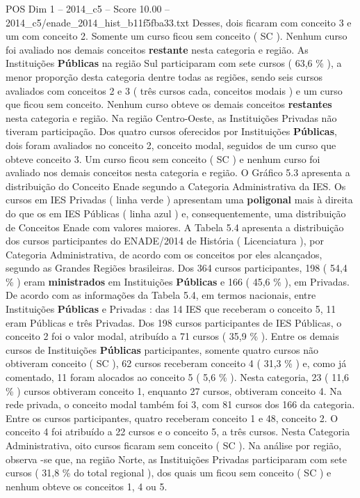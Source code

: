 \begin{textsample}{POS Dim 1 – 2014\_c5 – Score 10.00 – 2014\_c5/enade\_2014\_hist\_b11f5fba33.txt}
Desses, dois ficaram com conceito 3 e um com conceito 2.
Somente um curso ficou sem conceito ( SC ).
Nenhum curso foi avaliado nos demais conceitos \textbf{restante} nesta categoria e região.
As Instituições \textbf{Públicas} na região Sul participaram com sete cursos ( 63,6 \% ), a menor proporção desta categoria dentre todas as regiões, sendo seis cursos avaliados com conceitos 2 e 3 ( três cursos cada, conceitos modais ) e um curso que ficou sem conceito.
Nenhum curso obteve os demais conceitos \textbf{restantes} nesta categoria e região.
Na região Centro-Oeste, as Instituições Privadas não tiveram participação.
Dos quatro cursos oferecidos por Instituições \textbf{Públicas}, dois foram avaliados no conceito 2, conceito modal, seguidos de um curso que obteve conceito 3.
Um curso ficou sem conceito ( SC ) e nenhum curso foi avaliado nos demais conceitos nesta categoria e região.
O Gráfico 5.3 apresenta a distribuição do Conceito Enade segundo a Categoria Administrativa da IES.
Os cursos em IES Privadas ( linha verde ) apresentam uma \textbf{poligonal} mais à direita do que os em IES Públicas ( linha azul ) e, consequentemente, uma distribuição de Conceitos Enade com valores maiores.
A Tabela 5.4 apresenta a distribuição dos cursos participantes do ENADE/2014 de História ( Licenciatura ), por Categoria Administrativa, de acordo com os conceitos por eles alcançados, segundo as Grandes Regiões brasileiras.
Dos 364 cursos participantes, 198 ( 54,4 \% ) eram \textbf{ministrados} em Instituições \textbf{Públicas} e 166 ( 45,6 \% ), em Privadas.
De acordo com as informações da Tabela 5.4, em termos nacionais, entre Instituições \textbf{Públicas} e Privadas : das 14 IES que receberam o conceito 5, 11 eram Públicas e três Privadas.
Dos 198 cursos participantes de IES Públicas, o conceito 2 foi o valor modal, atribuído a 71 cursos ( 35,9 \% ).
Entre os demais cursos de Instituições \textbf{Públicas} participantes, somente quatro cursos não obtiveram conceito ( SC ), 62 cursos receberam conceito 4 ( 31,3 \% ) e, como já comentado, 11 foram alocados ao conceito 5 ( 5,6 \% ).
Nesta categoria, 23 ( 11,6 \% ) cursos obtiveram conceito 1, enquanto 27 cursos, obtiveram conceito 4.
Na rede privada, o conceito modal também foi 3, com 81 cursos dos 166 da categoria.
Entre os cursos participantes, quatro receberam conceito 1 e 48, conceito 2.
O conceito 4 foi atribuído a 22 cursos e o conceito 5, a três cursos.
Nesta Categoria Administrativa, oito cursos ficaram sem conceito ( SC ).
Na análise por região, observa -se que, na região Norte, as Instituições Privadas participaram com sete cursos ( 31,8 \% do total regional ), dos quais um ficou sem conceito ( SC ) e nenhum obteve os conceitos 1, 4 ou 5.

\end{textsample}
